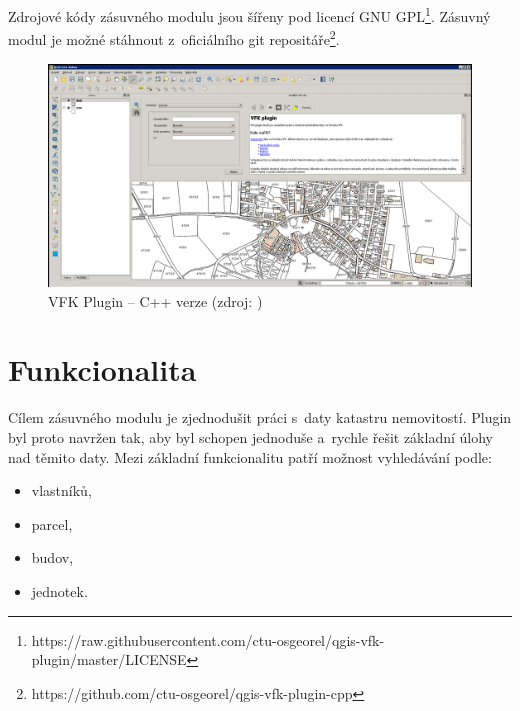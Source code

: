 \documentclass[a4paper,12pt,oneside]{book}
\begin{document}
Zdrojové kódy zásuvného modulu jsou šířeny pod licencí GNU GPL\footnote{https://raw.githubusercontent.com/ctu-osgeorel/qgis-vfk-plugin/master/LICENSE}. Zásuvný modul je možné stáhnout z~oficiálního git repositáře\footnote{https://github.com/ctu-osgeorel/qgis-vfk-plugin-cpp}. \cite{cvut_vfkPlugin}

\begin{figure}[htb]
\centering
\includegraphics[width=\textwidth]{images/vfkPlugin-puvodni_okno.png}
\caption[VFK Plugin -- C++ verze]{VFK Plugin -- C++ verze (zdroj: \cite{cvut_vfkPlugin})}
\end{figure}

\newpage
\section{Funkcionalita}
Cílem zásuvného modulu je zjednodušit práci s~daty katastru nemovitostí. Plugin byl proto navržen tak, aby byl schopen jednoduše a~rychle řešit základní úlohy nad těmito daty. Mezi základní funkcionalitu patří možnost vyhledávání podle:

\begin{itemize}
 \item vlastníků,
 \item parcel,
 \item budov,
 \item jednotek.
\end{itemize}
\end{document}
